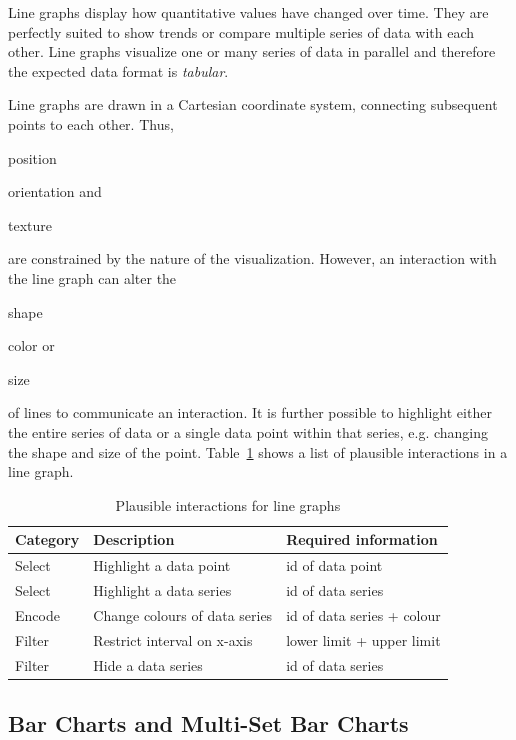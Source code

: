 Line graphs display how quantitative values have changed over time.
They are perfectly suited to show trends or compare multiple series of data with each other.
Line graphs visualize one or many series of data in parallel and therefore the expected data format is \emph{tabular}.

Line graphs are drawn in a Cartesian coordinate system, connecting subsequent points to each other.
Thus,
\begin{enumerate*}[label=(\arabic*)]
    \item position
    \item orientation and
    \item texture
\end{enumerate*}
are constrained by the nature of the visualization.
However, an interaction with the line graph can alter the
\begin{enumerate*}[label=(\arabic*)]
    \item shape
    \item color or
    \item size
\end{enumerate*}
of lines to communicate an interaction.
It is further possible to highlight either the entire series of data or a single data point within that series, e.g. changing the shape and size of the point.
Table~\ref{tab:analysis:line-graph:interactions} shows a list of plausible interactions in a line graph.

\begin{table}[H]
  \centering
  \begin{tabular*}{\textwidth}{lll}
    \bf Category & \bf Description & \bf Required information \\
    \hline
    Select & Highlight a data point & id of data point \\
    Select & Highlight a data series & id of data series \\
    Encode & Change colours of data series & id of data series + colour \\
    Filter & Restrict interval on x-axis & lower limit + upper limit \\
    Filter & Hide a data series & id of data series \\
  \end{tabular*}
  \caption{Plausible interactions for line graphs}%
  \label{tab:analysis:line-graph:interactions}
\end{table}




\subsection{Bar Charts and Multi-Set Bar Charts}

